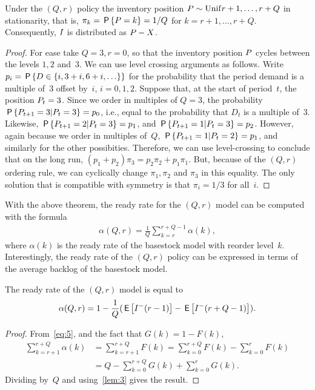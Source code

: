 \documentclass[queueing-book.tex]{subfiles}
\begin{document}
\begin{theorem}\label{thr:3}
Under the $(Q,r)$ policy the inventory position $\IP \sim \Unif{r+1, \ldots, r+Q}$ in stationarity,  that is, $\pi_{k} = \P{\IP = k} = 1/Q$ for $k=r+1, \ldots, r+Q$. Consequently, $\IL$ is distributed as $\IP-X$.
\end{theorem}
\begin{proof}
For ease take $Q=3, r=0$, so that the inventory position $\IP$ cycles between the levels $1, 2$ and~$3$.
We can use level crossing arguments as follows.
Write $p_{i} = \P{D\in \{i, 3+i, 6+i, \ldots\}}$ for the probability that the period demand is a multiple of~$3$ offset by~$i$, $i=0, 1, 2$.
Suppose that, at the start of period~$t$, the position $\IP_{t} = 3$.
Since we order in multiples of $Q=3$, the probability $\P{\IP_{t+1} =3|\IP_{t}=3} = p_{0}$, i.e., equal to the probability that $D_{t}$ is a multiple of~$3$.
Likewise, $\P{\IP_{t+1} = 2|\IP_t=3} = p_{1}$, and $\P{\IP_{t+1} = 1|\IP_t=3} = p_{2}$.
However, again because we order in multiples of~$Q$, $\P{\IP_{t+1} = 1|\IP_t=2} = p_{1}$, and similarly for the other possibities.
Therefore, we can use level-crossing to conclude that on the long run, $(p_{1}+p_2)\pi_{3} = p_2\pi_{2} + p_1 \pi_{1}$.
But, because of the $(Q,r)$ ordering rule, we can cyclically change $\pi_{1}, \pi_{2}$ and $\pi_{3}$ in this equality.
The only solution that is compatible with symmetry is that $\pi_{i} = 1/3$ for all~$i$.
\end{proof}

With the above theorem, the ready rate for the $(Q,r)$ model can be computed with the formula
\begin{align}
   \alpha(Q,r) = \frac1Q \sum_{k=r}^{r+Q-1} \alpha(k), %
\end{align}
where $\alpha(k)$ is the ready rate  of the basestock model with reorder level~$k$. Interestingly, the ready rate of the $(Q,r)$ policy can be expressed in terms of the
average backlog of the basestock model.

\begin{lemma}
The ready rate of the $(Q,r)$ model is equal to
\begin{align}
   \alpha(Q,r) = 1 - \frac1Q(\E{I^{-}(r-1)} - \E{I^{-}(r+Q-1)}).
\end{align}
\end{lemma}
\begin{proof}
From~\cref{eq:5}, and the fact that $G(k) = 1- F(k)$,
\begin{align*}
\sum_{k=r+1}^{r+Q} \alpha(k)
  &=  \sum_{k=r+1}^{r+Q} F(k)
  =  \sum_{k=0}^{r+Q} F(k)  -  \sum_{k=0}^{r} F(k) \\
  &= Q - \sum_{k=0}^{r+Q} G(k)  +  \sum_{k=0}^{r} G(k).
\end{align*}
Dividing by~$Q$ and using~\cref{lem:3} gives the result.
\end{proof}
\end{document}
